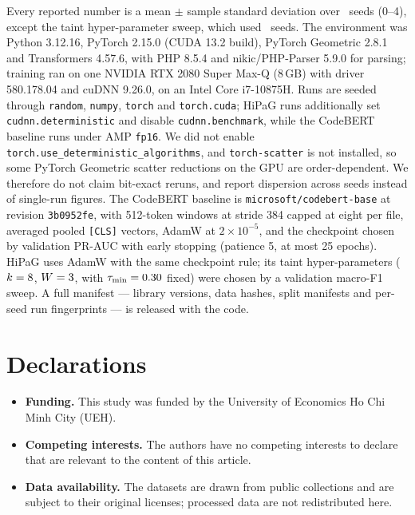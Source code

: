 \documentclass[pdflatex,sn-mathphys-num]{sn-jnl}
\begin{document}
Every reported number is a mean $\pm$ sample standard deviation over
\RqOneSeeds\ seeds (0--4), except the taint hyper-parameter sweep, which used
\RqFiveSeeds\ seeds. The environment was Python 3.12.16, PyTorch 2.15.0 (CUDA
13.2 build), PyTorch Geometric 2.8.1 and Transformers 4.57.6, with PHP 8.5.4
and nikic/PHP-Parser 5.9.0 for parsing; training ran on one NVIDIA RTX 2080
Super Max-Q (8\,GB) with driver 580.178.04 and cuDNN 9.26.0, on an Intel Core
i7-10875H. Runs are seeded through \texttt{random}, \texttt{numpy},
\texttt{torch} and \texttt{torch.cuda}; HiPaG runs additionally set
\texttt{cudnn.deterministic} and disable \texttt{cudnn.benchmark}, while the
CodeBERT baseline runs under AMP \texttt{fp16}. We did not enable
\texttt{torch.use\_deterministic\_algorithms}, and \texttt{torch-scatter} is
not installed, so some PyTorch Geometric scatter reductions on the GPU are
order-dependent. We therefore do not claim bit-exact reruns, and report
dispersion across seeds instead of single-run figures. The CodeBERT baseline
is \texttt{microsoft/codebert-base} at revision \texttt{3b0952fe}, with
512-token windows at stride 384 capped at eight per file, averaged pooled
\texttt{[CLS]} vectors, AdamW at $2\times10^{-5}$, and the checkpoint chosen by
validation PR-AUC with early stopping (patience 5, at most 25 epochs). HiPaG
uses AdamW with the same checkpoint rule; its taint hyper-parameters
($k=8$, $W=3$, with
$\tau_{\min}=0.30$ fixed) were chosen by a validation macro-F1
sweep. A full manifest --- library versions, data hashes, split manifests and
per-seed run fingerprints --- is released with the code.

\section*{Declarations}
\begin{itemize}
  \item \textbf{Funding.} This study was funded by the University of Economics
  Ho Chi Minh City (UEH).
  \item \textbf{Competing interests.} The authors have no competing interests
  to declare that are relevant to the content of this article.
  \item \textbf{Data availability.} The datasets are drawn from public
  collections and are subject to their original licenses; processed data are
  not redistributed here.
\end{itemize}
\end{document}

